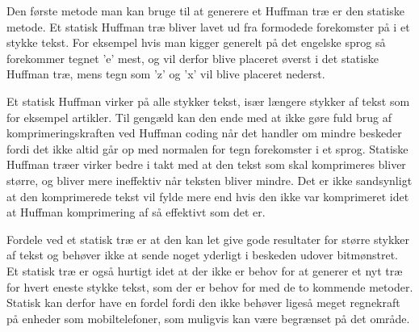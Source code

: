 Den første metode man kan bruge til at generere et Huffman træ er den statiske metode. Et statisk Huffman træ bliver lavet ud fra formodede forekomster på i et stykke tekst. For eksempel hvis man kigger generelt på det engelske sprog så forekommer tegnet ’e’ mest, og vil derfor blive placeret øverst i det statiske Huffman træ, mens tegn som ’z’ og ’x’ vil blive placeret nederst\cite{Hufftree_2}.

Et statisk Huffman virker på alle stykker tekst, især længere stykker af tekst som for eksempel artikler. Til gengæld kan den ende med at ikke gøre fuld brug af komprimeringskraften ved Huffman coding når det handler om mindre beskeder fordi det ikke altid går op med normalen for tegn forekomster i et sprog. Statiske Huffman træer virker bedre i takt med at den tekst som skal komprimeres bliver større, og bliver mere ineffektiv når teksten bliver mindre. Det er ikke sandsynligt at den komprimerede tekst vil fylde mere end hvis den ikke var komprimeret idet at Huffman komprimering af så effektivt som det er. \cite{Hufftree_3}

Fordele ved et statisk træ er at den kan let give gode resultater for større stykker af tekst og behøver ikke at sende noget yderligt i beskeden udover bitmønstret. Et statisk træ er også hurtigt idet at der ikke er behov for at generer et nyt træ for hvert eneste stykke tekst, som der er behov for med de to kommende metoder. Statisk kan derfor have en fordel fordi den ikke behøver ligeså meget regnekraft på enheder som mobiltelefoner, som muligvis kan være begrænset på det område.
